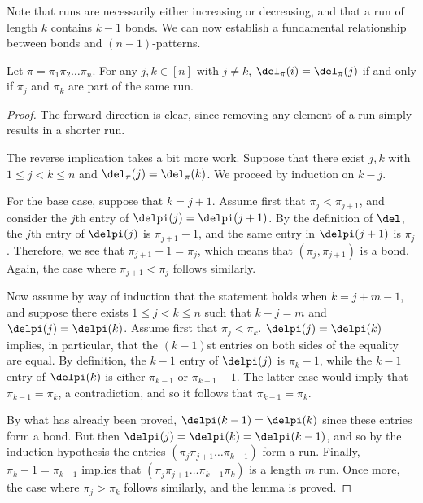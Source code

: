 \documentclass[12pt,twoside]{memoir}
\begin{document}
      Note that runs are necessarily either increasing or decreasing, and that a run
      of length $k$ contains $k-1$ bonds. We can now establish a fundamental
      relationship between bonds and $(n-1)$-patterns. 

      \begin{lemma} \label{fixpat:lem:bonds}
        Let $\pi = \pi_1 \pi_2 \dots \pi_n$. For any $j,k \in [n]$ with $j \neq
        k$, $\del_\pi(i) = \del_\pi(j)$ if and only if $\pi_j$ and $\pi_k$ are
        part of the same run. 
      \end{lemma}
      \begin{proof}
        The forward direction is clear, since removing any element of a run
        simply results in a shorter run. 

        The reverse implication takes a bit more work. Suppose that there exist
        $j,k$ with $1 \leq j < k \leq n$ and $\del_\pi(j) = \del_\pi(k)$. We
        proceed by induction on $k-j$. 

        For the base case, suppose that $k =j+ 1$. Assume first that $\pi_j <
        \pi_{j+1}$, and consider the $j$th entry of $\delpi(j)=\delpi(j+1)$. By
        the definition of $\del$, the $j$th entry of $\delpi(j)$ is
        $\pi_{j+1}-1$, and the same entry in $\delpi(j+1)$ is $\pi_j$. Therefore,
        we see that $\pi_{j+1}-1=\pi_j$, which means that $(\pi_j,\pi_{j+1})$ is
        a bond. Again, the case where $\pi_{j+1}<\pi_j$ follows similarly. 

        Now assume by way of induction that the statement holds when $k=j+m-1$,
        and suppose there exists $1\leq j < k \leq n$ such that $k-j = m$ and
        $\delpi(j)=\delpi(k)$. Assume first that $\pi_j < \pi_{k}$.
        $\delpi(j)=\delpi(k)$ implies, in particular, that the $(k-1)$st entries
        on both sides of the equality are equal.  By definition, the $k-1$ entry
        of $\delpi(j)$ is $\pi_k-1$, while the $k-1$ entry of $\delpi(k)$ is
        either $\pi_{k-1}$ or $\pi_{k-1}-1$. The latter case would imply that
        $\pi_{k-1} = \pi_k$, a contradiction, and so it follows that $\pi_{k-1} =
        \pi_k$. 

        By what has already been proved, $\delpi(k-1) = \delpi(k)$ since these
        entries form a bond. But then $\delpi(j) = \delpi(k) = \delpi(k-1)$, and
        so by the induction hypothesis the entries $(\pi_j \pi_{j+1} \dots
        \pi_{k-1})$ form a run. Finally, $\pi_k - 1 = \pi_{k-1}$ implies that
        $(\pi_j \pi_{j+1} \dots \pi_{k-1} \pi_k)$ is a length $m$ run.  Once
        more, the case where $\pi_j > \pi_k$ follows similarly, and the lemma is
        proved.
      \end{proof}
\end{document}
